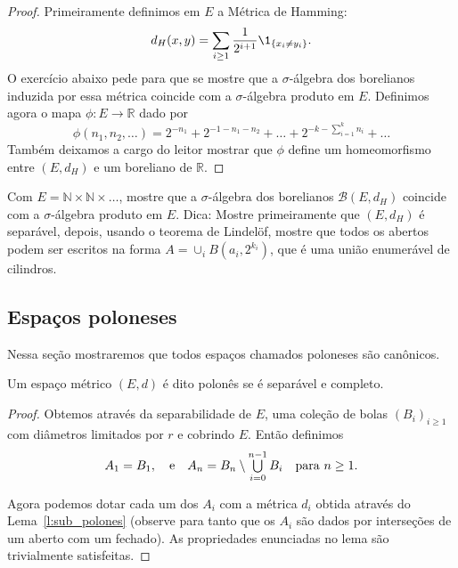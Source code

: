 \begin{proof}
  Primeiramente definimos em $E$ a Métrica de Hamming:
  \begin{equation}
    \label{e:hamming_distance}
    d_H(x,y) = \sum_{i \geq 1} \frac{1}{2^{i + 1}} \1_{\{x_i \neq y_i\}}.
  \end{equation}
  O exercício abaixo pede para que se mostre que a $\sigma$-álgebra dos borelianos induzida por essa métrica coincide com a $\sigma$-álgebra produto em $E$.
  Definimos agora o mapa $\phi:E \to \mathbb{R}$ dado por
  \begin{equation}
    \phi(n_1, n_2, \dots) = 2^{-n_1} + 2^{-1 - n_1 - n_2} + \dots + 2^{-k - \sum_{i=1}^k n_i} + \dots
  \end{equation}
  Também deixamos a cargo do leitor mostrar que $\phi$ define um homeomorfismo entre $(E,d_H)$ e um boreliano de $\mathbb{R}$.
\end{proof}

\begin{exercise}
  Com $E = \mathbb{N} \times \mathbb{N} \times \dots$, mostre que a $\sigma$-álgebra dos borelianos $\mathcal{B}(E, d_H)$ coincide com a $\sigma$-álgebra produto em $E$.
  Dica: Mostre primeiramente que $(E, d_H)$ é separável, depois, usando o teorema de Lindelöf, mostre que todos os abertos podem ser escritos na forma $A = \cup_i B(a_i, 2^{k_i})$, que é uma união enumerável de cilindros.
\end{exercise}

\subsection{Espaços poloneses}

Nessa seção mostraremos que todos espaços chamados poloneses são canônicos.

\begin{definition}
  Um espaço métrico $(E,d)$ é dito polonês  se é separável e completo.
\end{definition}


\begin{proof}
  Obtemos através da separabilidade de $E$, uma coleção de bolas $(B_i)_{i \geq 1}$ com diâmetros limitados por $r$ e cobrindo $E$.
  Então definimos
  \begin{equation}
    A_1 = B_1, \quad \text{e} \quad A_n = B_n \setminus \operatorname*{{\textstyle \bigcup}}_{i=0}^{n-1} B_i \quad \text{para $n \geq 1$.}
  \end{equation}

  Agora podemos dotar cada um dos $A_i$ com a métrica $d_i$ obtida através do Lema~\ref{l:sub_polones} (observe para tanto que os $A_i$ são dados por interseções de um aberto com um fechado).
  As propriedades enunciadas no lema são trivialmente satisfeitas.
\end{proof}


